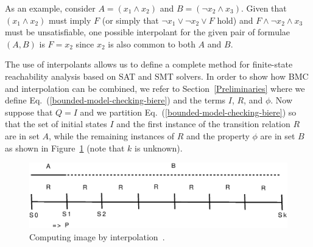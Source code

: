 \documentclass[format=acmsmall, review=false, screen=true]{acmart}
\begin{document}
As an example, consider $A = \left(x_1 \wedge x_2\right)$ and $B = \left(\neg x_2 \wedge x_3\right)$. Given that $\left(x_1 \wedge x_2\right)$ must imply $F$ (or simply that $\neg x_1 \vee \neg x_2 \vee F$ hold) and $F \wedge \neg x_2 \wedge x_3$ must be unsatisfiable, one possible interpolant for the given pair of formulae $\left(A,B\right)$ is $F = x_2$ since $x_2$ is also common to both $A$ and $B$. 

The use of interpolants allows us to define a complete method for finite-state reachability analysis based on SAT and SMT solvers. In order to show how BMC and interpolation can be combined, we refer to Section~\ref{Preliminaries} where we define Eq.~(\ref{bounded-model-checking-biere}) and the terms $I$, $R$, and $\phi$. Now suppose that $Q=I$ and we partition Eq.~(\ref{bounded-model-checking-biere}) so that the set of initial states $I$ and the first instance of the transition relation $R$ are in set $A$, while the remaining instances of $R$ and the property $\phi$ are in set $B$ as shown in Figure~\ref{figure:computing-image-by-interpolation} (note that $k$ is unknown).

\begin{figure}[ht]
\centering
\includegraphics[scale=0.4]{interpolants}
\caption{Computing image by interpolation~\cite{McMillan03}.}
\label{figure:computing-image-by-interpolation}
\end{figure}
\end{document}
